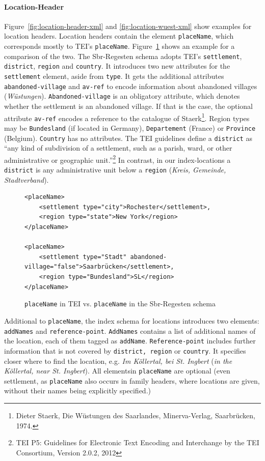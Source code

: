 \paragraph{Location-Header}
\label{sec:location-header}
Figure~\ref{fig:location-header-xml} and \ref{fig:location-wuest-xml} show examples for location headers. Location headers contain the element \texttt{placeName}, which corresponds mostly to TEI's \texttt{placeName}. Figure~\ref{fig:placeName} shows an example for a comparison of the two. The Sbr-Regesten schema adopts TEI's \texttt{settlement}, \texttt{district}, \texttt{region} and \texttt{country}. It introduces two new attributes for the \texttt{settlement} element, aside from \texttt{type}. It gets the additional attributes \texttt{abandoned-village} and \texttt{av-ref} to encode information about abandoned villages (\textit{Wüstungen}). \texttt{Abandoned-village} is an obligatory attribute, which denotes whether the settlement is an abandoned village. If that is the case, the optional attribute \texttt{av-ref} encodes a reference to the catalogue of Staerk\footnote{Dieter Staerk, Die Wüstungen des Saarlandes, Minerva-Verlag, Saarbrücken, 1974.}. Region types may be \texttt{Bundesland} (if located in Germany), \texttt{Departement} (France) or \texttt{Province} (Belgium). \texttt{Country} has no attributes. The TEI guidelines define a \texttt{district} as “any kind of subdivision of a settlement, such as a parish, ward, or other administrative or geographic unit.”\footnote{TEI P5: Guidelines for Electronic Text Encoding and Interchange by the TEI Consortium, Version 2.0.2, 2012} In contrast, in our index-locations a \texttt{district} is any administrative unit below a \texttt{region} (\textit{Kreis, Gemeinde, Stadtverband}).

\begin{figure}[H]
\centering
\begin{verbatim}
<placeName>
    <settlement type="city">Rochester</settlement>,
    <region type="state">New York</region>
</placeName>

<placeName>
    <settlement type="Stadt" abandoned-village="false">Saarbrücken</settlement>,
    <region type="Bundesland">SL</region>
</placeName>
\end{verbatim}
\caption{\texttt{placeName} in TEI vs. \texttt{placeName} in the Sbr-Regesten schema}
\label{fig:placeName}
\end{figure}

Additional to \texttt{placeName}, the index schema for locations introduces two elements: \texttt{addNames} and \texttt{reference-point}. \texttt{AddNames} contains a list of additional names of the location, each of them tagged as \texttt{addName}. \texttt{Reference-point} includes further information that is not covered by \texttt{district, region} or \texttt{country}. It specifies closer where to find the location, e.g. \textit{Im Köllertal, bei St. Ingbert} (\textit{in the Köllertal, near St. Ingbert}). All elementsin \texttt{placeName} are optional (even settlement, as \texttt{placeName} also occurs in family headers, where locations are given, without their names being explicitly specified.)   

